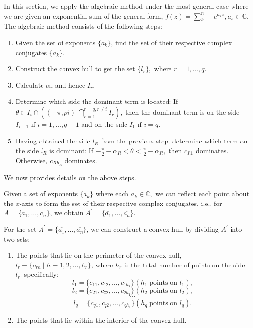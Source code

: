 \documentclass[11pt,reqno,oneside,a4paper]{article}
\begin{document}
In this section, we apply the algebraic method under the most general case where we are given an exponential sum of the general form, $f(z) = \sum_{k=1}^{n}e^{a_k z}, a_k \in \mathbb{C}$. The algebraic method consists of the following steps:

\begin{enumerate}
	\item Given the set of exponents $\{a_k\}$, find the set of their respective complex conjugates $\{\overline{a_k}\}$.
	\item Construct the convex hull to get the set $\{l_r\},$ where $r = 1,\dots,q.$
	\item Calculate $\alpha_r$ and hence $I_r$.
	\item Determine which side the dominant term is located:
	If $\theta \in I_i \cap \left((-\pi,pi)\ \bigcap_{r=1}^{r=q,r\neq i}I_r \right),$ then the dominant term is on the side $I_{i+1}$ if $i = 1,\dots,q-1$ and on the side $I_1$ if $i = q$.
	\item Having obtained the side $l_R$ from the previous step, determine which term on the side $l_R$ is dominant:
	If $-\frac{\pi}{2} - \alpha_R < \theta < \frac{\pi}{2} - \alpha_R,$  then $c_{R1}$ dominates. Otherwise, $c_{R h_R}$ dominates.
\end{enumerate}

We now provides details on the above steps. 

Given a set of exponents $\{a_k\}$ where each $a_k \in \mathbb{C},$ we can reflect each point about the $x$-axis to form the set of their respective complex conjugates, i.e., for $A =\{a_1,\dots,a_n\}$, we obtain $A^\prime = \{\overline{a_1}, \dots, \overline{a_n}\}$. 

For the set $A^\prime = \{\overline{a_1}, \dots, \overline{a_n}\}$, we can construct a convex hull by dividing $A^\prime$ into two sets:

\begin{enumerate}
	\item The points that lie on the perimeter of the convex hull, $l_r = \{c_{rh}\mid h = 1,2,\dots, h_r\}$, where $h_r$ is the total number of points on the side $l_r$, specifically:
	$$l_1 = \{c_{1 1}, c_{1 2}, \dots, c_{1 h_1} \} (h_1 \text{ points on } l_1),$$
	$$l_2 = \{c_{2 1}, c_{2 2}, \dots, c_{2 h_1} \} (h_2 \text{ points on } l_2),$$
	$$\cdots$$
	$$l_q = \{c_{q 1}, c_{q 2}, \dots, c_{q h_1} \} (h_q \text{ points on } l_q).$$
	\item The points that lie within the interior of the convex hull. 
\end{enumerate}
\end{document}

